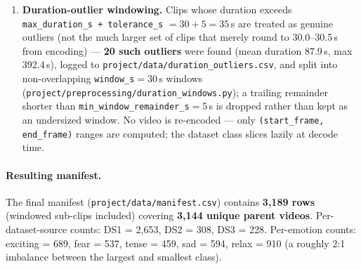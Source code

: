 \documentclass[11pt]{article}
\begin{document}
\begin{enumerate}
  \texttt{<youtube\_id>\_02.mp4} have the trailing 2-digit segment index stripped; DS2 stems are
  used as-is (bare YouTube ids, no observed segmentation).
  \item \textbf{Duration-outlier windowing.} Clips whose duration exceeds
  \texttt{max\_duration\_s + tolerance\_s} $= 30+5=35$\,s are treated as genuine outliers (not the
  much larger set of clips that merely round to 30.0--30.5\,s from encoding) --- \textbf{20 such
  outliers} were found (mean duration 87.9\,s, max 392.4\,s), logged to
  \texttt{project/data/duration\_outliers.csv}, and split into non-overlapping
  \texttt{window\_s}$=30$\,s windows (\texttt{project/preprocessing/duration\_windows.py}); a
  trailing remainder shorter than \texttt{min\_window\_remainder\_s}$=5$\,s is dropped rather than
  kept as an undersized window. No video is re-encoded --- only \texttt{(start\_frame,
  end\_frame)} ranges are computed; the dataset class slices lazily at decode time.
\end{enumerate}

\paragraph{Resulting manifest.} The final manifest (\texttt{project/data/manifest.csv}) contains
\textbf{3{,}189 rows} (windowed sub-clips included) covering \textbf{3{,}144 unique parent
videos}. Per-dataset-source counts: DS1 = 2{,}653, DS2 = 308, DS3 = 228. Per-emotion counts:
exciting = 689, fear = 537, tense = 459, sad = 594, relax = 910 (a roughly 2:1 imbalance between
the largest and smallest class).
\end{document}
